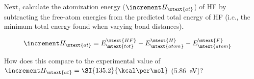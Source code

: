 \begin{enumerate}

Next, calculate the atomization energy (\( \increment H_\mtext{at} \)) of HF by subtracting the free-atom energies from the predicted total energy of HF (i.e., the minimum total energy found when varying bond distances).

\begin{equation}
 \increment H_\mtext{at}= E^\mtext{HF}_\mtext{tot} - E^\mtext{H}_\mtext{atom} - E^\mtext{F}_\mtext{atom}
\end{equation}

How does this compare to the experimental value of \(\increment H_\mtext{at}=\SI{135.2}{\kcal\per\mol}\) (\SI{5.86}{\eV})? 


\end{enumerate}
